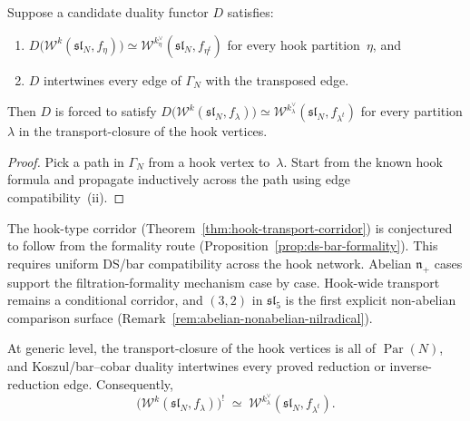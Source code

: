 \begin{proposition}
\label{prop:transport-propagation}
Suppose a candidate duality functor $D$ satisfies:
\begin{enumerate}[label=\textup{(\roman*)}]
\item $D\bigl(\mathcal{W}^k(\mathfrak{sl}_N, f_\eta)\bigr)
 \simeq \mathcal{W}^{k_\eta^\vee}(\mathfrak{sl}_N, f_{\eta^t})$
 for every hook partition~$\eta$, and
\item $D$ intertwines every edge of $\Gamma_N$ with the
 transposed edge.
\end{enumerate}
Then $D$ is forced to satisfy
$D\bigl(\mathcal{W}^k(\mathfrak{sl}_N, f_\lambda)\bigr)
\simeq \mathcal{W}^{k_\lambda^\vee}(\mathfrak{sl}_N, f_{\lambda^t})$
for every partition $\lambda$ in the transport-closure of the
hook vertices.
\end{proposition}

\begin{proof}
Pick a path in $\Gamma_N$ from a hook vertex to~$\lambda$.
Start from the known hook formula and propagate inductively across
the path using edge compatibility~(ii).
\end{proof}

\begin{remark}
\label{rem:hook-formality-mechanism}
The hook-type corridor (Theorem~\ref{thm:hook-transport-corridor})
is conjectured to follow from the formality route
(Proposition~\ref{prop:ds-bar-formality}). This requires uniform
DS/bar compatibility across the hook network.  Abelian
$\mathfrak n_+$ cases support the filtration-formality mechanism case by
case.  Hook-wide transport remains a conditional corridor, and $(3,2)$ in
$\mathfrak{sl}_5$ is the
first explicit non-abelian comparison surface
(Remark~\ref{rem:abelian-nonabelian-nilradical}).
\end{remark}

\begin{conjecture}
\label{conj:type-a-transport-to-transpose}
At generic level, the transport-closure of the hook vertices is
all of $\operatorname{Par}(N)$, and Koszul/bar--cobar duality
intertwines every proved reduction or inverse-reduction edge.
Consequently,
\[
\bigl(\mathcal{W}^k(\mathfrak{sl}_N, f_\lambda)\bigr)^!
\;\simeq\;
\mathcal{W}^{k_\lambda^\vee}(\mathfrak{sl}_N, f_{\lambda^t}).
\]
\end{conjecture}

